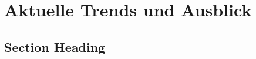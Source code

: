 \chapter{Aktuelle Trends und Ausblick}
\label{trends} %



\section{Section Heading}


\printbibliography

